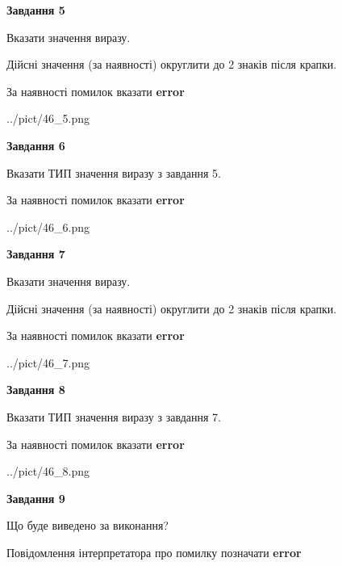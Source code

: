 \documentclass[11pt, ukrainian]{article}
\begin{document}
{\begin {large}
{\begin {center}\textbf{Завдання 5}\end {center}}\par
Вказати значення виразу. \par
Дійсні значення (за наявності) округлити до 2 знаків після крапки. \par
За наявності помилок вказати \textbf{error}

\begin{center}
	{../pict/46_5.png}
\end{center}
\newpage

{\begin {center}\textbf{Завдання 6}\end {center}}\par
Вказати ТИП значення виразу з завдання 5. \par
За наявності помилок вказати \textbf{error}

\begin{center}
	{../pict/46_6.png}
\end{center}
\newpage

{\begin {center}\textbf{Завдання 7}\end {center}}\par
Вказати значення виразу. \par
Дійсні значення (за наявності) округлити до 2 знаків після крапки. \par
За наявності помилок вказати \textbf{error}

\begin{center}
	{../pict/46_7.png}
\end{center}
\newpage

{\begin {center}\textbf{Завдання 8}\end {center}}\par
Вказати ТИП значення виразу з завдання 7. \par
За наявності помилок вказати \textbf{error}

\begin{center}
	{../pict/46_8.png}
\end{center}
\newpage

{\begin {center}\textbf{Завдання 9}\end {center}}\par
Що буде виведено за виконання? \par
Повідомлення інтерпретатора про помилку позначати \textbf{error}


\end{large}}
\end{document}
